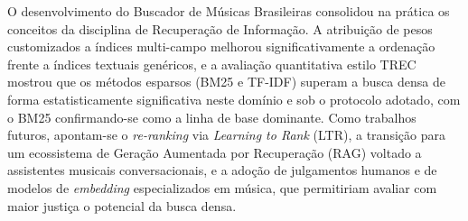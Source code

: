 \documentclass[12pt]{article}
\begin{document}
O desenvolvimento do Buscador de Músicas Brasileiras consolidou na prática os
conceitos da disciplina de Recuperação de Informação. A atribuição de pesos
customizados a índices multi-campo melhorou significativamente a ordenação frente
a índices textuais genéricos, e a avaliação quantitativa estilo TREC mostrou que
os métodos esparsos (BM25 e TF-IDF) superam a busca densa de forma
estatisticamente significativa neste domínio e sob o protocolo adotado, com o
BM25 confirmando-se como a linha de base dominante. Como trabalhos futuros,
apontam-se o \textit{re-ranking} via \textit{Learning to Rank} (LTR), a transição
para um ecossistema de Geração Aumentada por Recuperação (RAG) voltado a
assistentes musicais conversacionais, e a adoção de julgamentos humanos e de
modelos de \textit{embedding} especializados em música, que permitiriam avaliar
com maior justiça o potencial da busca densa.



\end{document}

